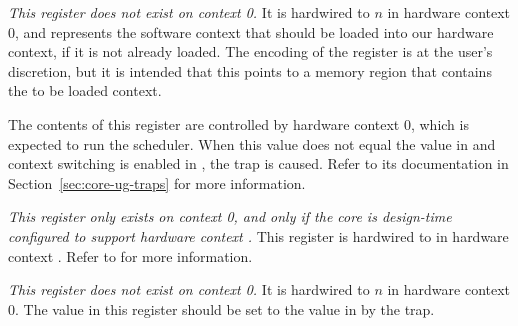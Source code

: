 
\emph{This register does not exist on context 0.} It is hardwired to
$n$ in hardware context 0, and represents the software context that
should be loaded into our hardware context, if it is not already loaded. The
encoding of the register is at the user's discretion, but it is intended that
this points to a memory region that contains the to be loaded context.

The contents of this register are controlled by hardware context 0, which is 
expected to run the scheduler. When this value does not equal the value in 
 and context switching is enabled in , the 
 trap is caused. Refer to its documentation in
Section~\ref{sec:core-ug-traps} for more information.



\emph{This register only exists on context 0, and only if the core is
design-time configured to support hardware context \n{}.} This register is 
hardwired to  in hardware context \n{}. Refer to  for more
information.

\coreCanWrite{}
\debugCanWrite{}


\emph{This register does not exist on context 0.} It is hardwired to
$n$ in hardware context 0. The value in this register should be set
to the value in  by the  trap.

\coreCanWrite{}
\debugCanWrite{}

